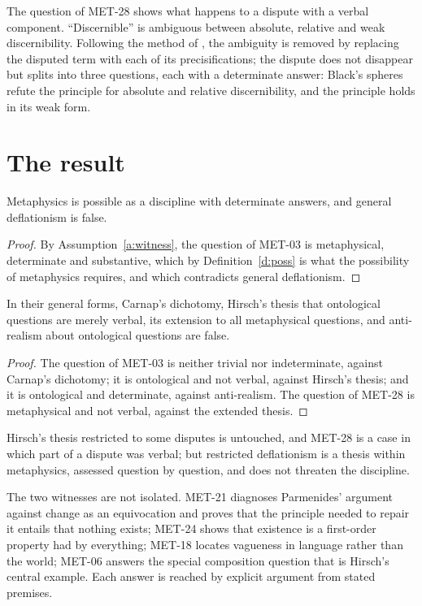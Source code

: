\documentclass{situationist-preprint}
\begin{document}
The question of MET-28 shows what happens to a dispute with a verbal component. \enquote{Discernible} is ambiguous between absolute, relative and weak discernibility. Following the method of \citet{Chalmers2011}, the ambiguity is removed by replacing the disputed term with each of its precisifications; the dispute does not disappear but splits into three questions, each with a determinate answer: Black's spheres refute the principle for absolute and relative discernibility, and the principle holds in its weak form.

\section{The result}

\begin{theorem}\label{t:main}
Metaphysics is possible as a discipline with determinate answers, and general deflationism is false.
\end{theorem}

\begin{proof}
By Assumption~\ref{a:witness}, the question of MET-03 is metaphysical, determinate and substantive, which by Definition~\ref{d:poss} is what the possibility of metaphysics requires, and which contradicts general deflationism.
\end{proof}

\begin{corollary}\label{c:theses}
In their general forms, Carnap's dichotomy, Hirsch's thesis that ontological questions are merely verbal, its extension to all metaphysical questions, and anti-realism about ontological questions are false.
\end{corollary}

\begin{proof}
The question of MET-03 is neither trivial nor indeterminate, against Carnap's dichotomy; it is ontological and not verbal, against Hirsch's thesis; and it is ontological and determinate, against anti-realism. The question of MET-28 is metaphysical and not verbal, against the extended thesis.
\end{proof}

Hirsch's thesis restricted to some disputes is untouched, and MET-28 is a case in which part of a dispute was verbal; but restricted deflationism is a thesis within metaphysics, assessed question by question, and does not threaten the discipline.

The two witnesses are not isolated. MET-21 diagnoses Parmenides' argument against change as an equivocation and proves that the principle needed to repair it entails that nothing exists; MET-24 shows that existence is a first-order property had by everything; MET-18 locates vagueness in language rather than the world; MET-06 answers the special composition question that is Hirsch's central example. Each answer is reached by explicit argument from stated premises.
\end{document}
